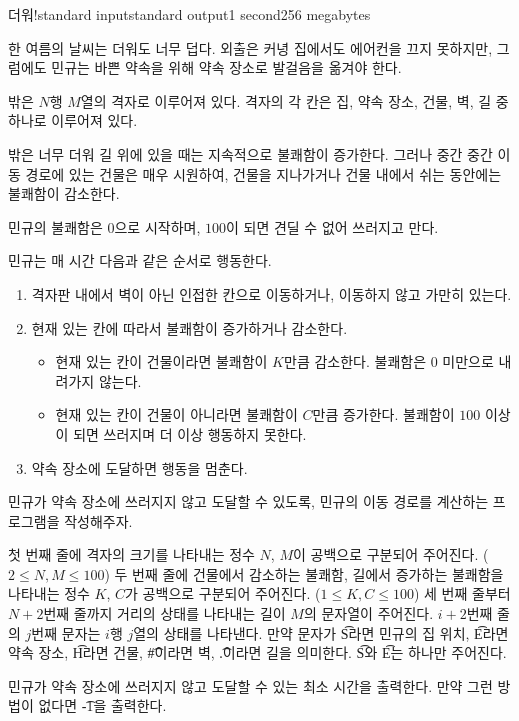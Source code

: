 \begin{problem}{더워!}{standard input}{standard output}{1 second}{256 megabytes}

한 여름의 날씨는 더워도 너무 덥다. 외출은 커녕 집에서도 에어컨을 끄지 못하지만, 그럼에도 민규는 바쁜 약속을 위해 약속 장소로 발걸음을 옮겨야 한다. 

밖은 $N$행 $M$열의 격자로 이루어져 있다. 격자의 각 칸은 집, 약속 장소, 건물, 벽, 길 중 하나로 이루어져 있다.

밖은 너무 더워 길 위에 있을 때는 지속적으로 불쾌함이 증가한다. 그러나 중간 중간 이동 경로에 있는 건물은 매우 시원하여, 건물을 지나가거나 건물 내에서 쉬는 동안에는 불쾌함이 감소한다.

민규의 불쾌함은 $0$으로 시작하며, $100$이 되면 견딜 수 없어 쓰러지고 만다.

민규는 매 시간 다음과 같은 순서로 행동한다. 

\begin{enumerate}
  \item 격자판 내에서 벽이 아닌 인접한 칸으로 이동하거나, 이동하지 않고 가만히 있는다.

  \item 현재 있는 칸에 따라서 불쾌함이 증가하거나 감소한다.
  \begin{itemize}
    \item 현재 있는 칸이 건물이라면 불쾌함이 $K$만큼 감소한다. 불쾌함은 $0$ 미만으로 내려가지 않는다.
    \item 현재 있는 칸이 건물이 아니라면 불쾌함이 $C$만큼 증가한다. 불쾌함이 $100$ 이상이 되면 쓰러지며 더 이상 행동하지 못한다.
  \end{itemize}

  \item 약속 장소에 도달하면 행동을 멈춘다.
\end{enumerate}

민규가 약속 장소에 쓰러지지 않고 도달할 수 있도록, 민규의 이동 경로를 계산하는 프로그램을 작성해주자.

\InputFile
첫 번째 줄에 격자의 크기를 나타내는 정수 $N$, $M$이 공백으로 구분되어 주어진다. ($2 \leq N, M \leq 100$)
두 번째 줄에 건물에서 감소하는 불쾌함, 길에서 증가하는 불쾌함을 나타내는 정수 $K$, $C$가 공백으로 구분되어 주어진다. ($1 \leq K, C \leq 100$)
세 번째 줄부터 $N+2$번째 줄까지 거리의 상태를 나타내는 길이 $M$의 문자열이 주어진다. $i+2$번째 줄의 $j$번째 문자는 $i$행 $j$열의 상태를 나타낸다. 만약 문자가 \t{S}라면 민규의 집 위치, \t{E}라면 약속 장소, \t{H}라면 건물, \t{#}이라면 벽, \t{.}이라면 길을 의미한다. \t{S}와 \t{E}는 하나만 주어진다.

\OutputFile
민규가 약속 장소에 쓰러지지 않고 도달할 수 있는 최소 시간을 출력한다. 만약 그런 방법이 없다면 \t{-1}을 출력한다.

\Examples

\begin{example}
%
%
\end{example}

\end{problem}

